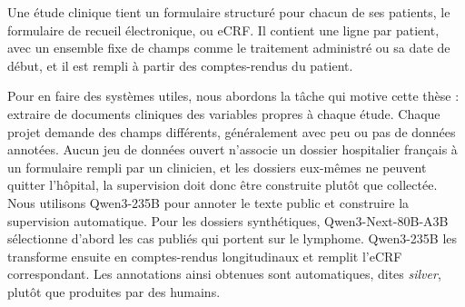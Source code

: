 
\noindent Une étude clinique tient un formulaire structuré pour chacun de ses patients, le
formulaire de recueil électronique, ou eCRF. Il contient une ligne par patient, avec
un ensemble fixe de champs comme le traitement administré ou sa date de début, et il
est rempli à partir des comptes-rendus du patient.

Pour en faire des systèmes utiles, nous abordons la tâche qui motive cette thèse :
extraire de documents cliniques des variables propres à chaque étude. Chaque projet
demande des champs différents, généralement avec peu ou pas de données annotées. Aucun
jeu de données ouvert n'associe un dossier hospitalier français à un formulaire rempli
par un clinicien, et les dossiers eux-mêmes ne peuvent quitter l'hôpital, la
supervision doit donc être construite plutôt que collectée. Nous utilisons
Qwen3-235B pour annoter le texte public et construire la supervision automatique.
Pour les dossiers synthétiques, Qwen3-Next-80B-A3B sélectionne d'abord les cas
publiés qui portent sur le lymphome. Qwen3-235B les transforme ensuite en
comptes-rendus longitudinaux et remplit l'eCRF correspondant. Les annotations ainsi
obtenues sont automatiques, dites \textit{silver}, plutôt que produites par des humains.

